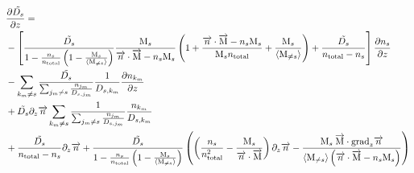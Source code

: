 \begin{landscape}
\begin{equation}
\begin{split}
& \frac{\partial\tilde{D_s}}{\partial z}  = \\
          & - \left[\frac{\tilde{D_s}}{1-\frac{n_s}{n_\text{total}}\left(1 - \frac{\text{M}_s}{\langle\text{M}_{\neq s}\rangle}\right)}
                  \frac{\text{M}_s}{\overrightarrow{n}\cdot\overrightarrow{\text{M}} - n_s\text{M}_s} 
                        \left(1 + \frac{\overrightarrow{n}\cdot\overrightarrow{\text{M}} - n_s\text{M}_s}{\text{M}_sn_\text{total}} + \frac{\text{M}_s}{\langle\text{M}_{\neq s}\rangle}\right)
                  + \frac{\tilde{D_s}}{n_\text{total} - n_s}\right]
                \frac{\partial n_s}{\partial z} \\
          & - \sum_{k_m\neq s}\frac{\tilde{D_s}}{\sum_{j_m \neq s}\frac{n_{j_m}}{D_{s,j_m}}}
                                \frac{1}{D_{s,k_m}} \frac{\partial n_{k_m}}{\partial z} \\
          & +  \tilde{D_s}\partial_{z}{\overrightarrow{n}} \sum_{k_m\neq s}
                           \frac{1}{\sum_{j_m \neq s}\frac{n_{j_m}}{D_{s,j_m}}}
                                        \frac{n_{k_m}}{D_{s,k_m}} \\
          & + \frac{\tilde{D_s}}{n_\text{total} - n_s}\partial_{z}{\overrightarrow{n}} 
            + \frac{\tilde{D_s}}{1-\frac{n_s}{n_\text{total}}\left(1 - \frac{\text{M}_s}{\langle\text{M}_{\neq s}\rangle}\right)}
              \left(\left(\frac{n_s}{n_\text{total}^2} - \frac{\text{M}_s}{\overrightarrow{n}\cdot\overrightarrow{\text{M}}}\right)\partial_{z}{\overrightarrow{n}}
                        - \frac{\text{M}_s\:\overrightarrow{\text{M}}\cdot\text{grad}_{z}\overrightarrow{n}}
                               {\langle\text{M}_{\neq s}\rangle\left(\overrightarrow{n}\cdot\overrightarrow{\text{M}} - n_s\text{M}_s\right)}
                    \right)\\
\end{split}
\label{Titan:diff_deriv_D_tilde}
\end{equation}
\end{landscape}

